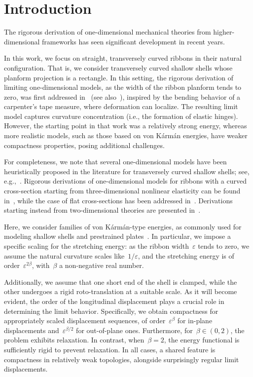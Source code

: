 \documentclass[a4, 11pt, reqno, final]{amsart}
\newcommand\e{\varepsilon}
\theoremstyle{plain}%
\begin{document}
	\section{Introduction}

	The rigorous derivation of one-dimensional mechanical theories from higher-dimensional frameworks has seen significant development in recent years.

	In this work, we focus on straight, transversely curved ribbons in their natural configuration. That is, we consider transversely curved shallow shells whose planform projection is a rectangle. In this setting, the rigorous derivation of limiting one-dimensional models, as the width of the ribbon planform tends to zero, was first addressed in~\cite{Paroni2024c} (see also~\cite{Coppede2024a}), inspired by the bending behavior of a carpenter’s tape measure, where deformation can localize. The resulting limit model captures curvature concentration (i.e., the formation of elastic hinges). However, the starting point in that work was a relatively strong energy, whereas more realistic models, such as those based on von Kármán energies, have weaker compactness properties, posing additional challenges.

	For completeness, we note that several one-dimensional models have been heuristically proposed in the literature for transversely curved shallow shells; see, e.g.,~\cite{Brunetti2020, Guinot2012, Picault2016, Kumar2023, Mao2024}.
	Rigorous derivations of one-dimensional models for ribbons with a curved cross-section starting from three-dimensional nonlinear elasticity can be found in~\cite{Davoli2013, Maor2025}, while the case of flat cross-sections has been addressed in~\cite{Freddi2012, Freddi2013}.
	Derivations starting instead from two-dimensional theories are presented in~\cite{Freddi2016a, Freddi2018}.

	Here, we consider families of von Kármán-type energies, as commonly used for modeling shallow shells and prestrained plates~\cite{Brunetti2020a, Brunetti2020c, Fabbrini2025, Kloda2025, JimenezBolanos2021, Lewicka2017, Tobasco2021a, Bella2025, Bartels2025, Velcic2012, PicchiScardaoni2021d}. In particular, we impose a specific scaling for the stretching energy: as the ribbon width~$\e$ tends to zero, we assume the natural curvature scales like~$1/\e$, and the stretching energy is of order~$\e^{2\beta}$, with~$\beta$ a non-negative real number.

	Additionally, we assume that one short end of the shell is clamped, while the other undergoes a rigid roto-translation at a suitable scale. As it will become evident, the order of the longitudinal displacement plays a crucial role in determining the limit behavior. Specifically, we obtain compactness for appropriately scaled displacement sequences, of order~$\e^\beta$ for in-plane displacements and~$\e^{\beta/2}$ for out-of-plane ones. Furthermore, for~$\beta \in (0, 2)$, the problem exhibits relaxation. In contrast, when~$\beta = 2$, the energy functional is sufficiently rigid to prevent relaxation. In all cases, a shared feature is compactness in relatively weak topologies, alongside surprisingly regular limit displacements.
\end{document}
